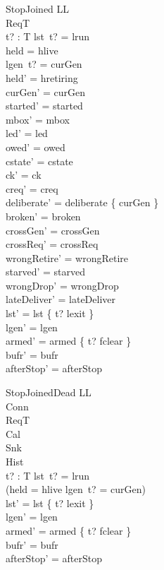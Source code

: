 \documentclass[a4paper,10pt,fleqn]{article}
\begin{document}
\begin{schema}{StopJoined}
  \Delta LL \\
  \Xi ReqT \\
  t? : T
\where
  lst~t? = lrun \\
  held = hlive \\
  lgen~t? = curGen \\
  held' = hretiring \\
  curGen' = curGen \\
  started' = started \\
  mbox' = mbox \\
  led' = led \\
  owed' = owed \\
  cstate' = cstate \\
  ck' = ck \\
  creq' = creq \\
  deliberate' = deliberate \cup \{ curGen \} \\
  broken' = broken \\
  crossGen' = crossGen \\
  crossReq' = crossReq \\
  wrongRetire' = wrongRetire \\
  starved' = starved \\
  wrongDrop' = wrongDrop \\
  lateDeliver' = lateDeliver \\
  lst' = lst \oplus \{ t? \mapsto lexit \} \\
  lgen' = lgen \\
  armed' = armed \oplus \{ t? \mapsto fclear \} \\
  bufr' = bufr \\
  afterStop' = afterStop
\end{schema}

\begin{schema}{StopJoinedDead}
  \Delta LL \\
  \Xi Conn \\
  \Xi ReqT \\
  \Xi Cal \\
  \Xi Snk \\
  \Xi Hist \\
  t? : T
\where
  lst~t? = lrun \\
  \lnot (held = hlive \land lgen~t? = curGen) \\
  lst' = lst \oplus \{ t? \mapsto lexit \} \\
  lgen' = lgen \\
  armed' = armed \oplus \{ t? \mapsto fclear \} \\
  bufr' = bufr \\
  afterStop' = afterStop
\end{schema}
\end{document}
